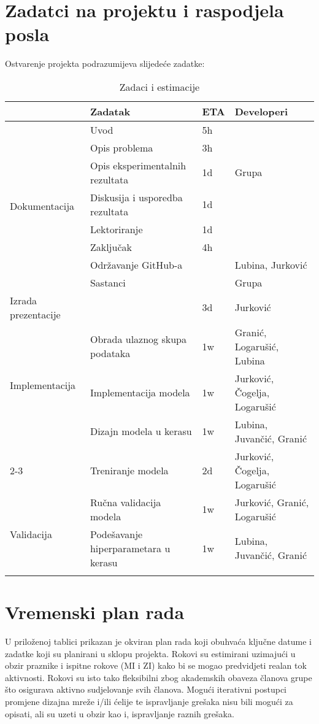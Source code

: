 \documentclass{report}
\begin{document}
\section{Zadatci na projektu i raspodjela posla}
Ostvarenje projekta podrazumijeva slijedeće zadatke:
\begin{longtable}{|p{100pt}| p{110pt} |p{20pt}| p{80pt}|}
\hline
 & \textbf{Zadatak} & \textbf{ETA} & \textbf{Developeri}\\
\hline
\multirow{8}{*}{Dokumentacija} & Uvod & 5h \\ \cline{3-3}
 & Opis problema & 3h \\ \cline{2-3}
 & Opis eksperimentalnih rezultata & 1d & Grupa \\ \cline{2-3}
 & Diskusija i usporedba rezultata & 1d \\ \cline{2-3}
 & Lektoriranje & 1d \\ \cline{2-3}
 & Zaključak & 4h \\ \hline
\multirow{2}{*}{Administrativni poslovi} & Održavanje GitHub-a & & Lubina, Jurković\\ \cline{2-3} & Sastanci & & Grupa \\ \hline
\multirow{1}{*}{Izrada prezentacije} &  & 3d & Jurković \\ \hline
\multirow{3}{*}{Implementacija} & Obrada ulaznog skupa podataka & 1w & Granić,  Logarušić, Lubina \\ \cline{2-3}
& Implementacija modela & 1w & Jurković, Čogelja, Logarušić \\ \hline
& Dizajn modela u kerasu & 1w & Lubina, Juvančić, Granić \\ \cline{2-3}
\multirow{2}{*}{Treniranje}
 & Treniranje modela & 2d & Jurković, Čogelja, Logarušić\\ \hline
\multirow{3}{*}{Validacija} & Ručna validacija modela & 1w & Jurković, Granić,  Logarušić\\ \cline{2-3} 
 & Podešavanje hiperparametara u kerasu & 1w & Lubina, Juvančić, Granić  \\ \hline 
 
\caption{Zadaci i estimacije}

\end{longtable}
\section{Vremenski plan rada}

U priloženoj tablici prikazan je okviran plan rada koji obuhvaća ključne datume i zadatke koji su planirani u sklopu projekta. Rokovi su estimirani uzimajući u obzir praznike i ispitne rokove (MI i ZI) kako bi se mogao predvidjeti realan tok aktivnosti. Rokovi su isto tako fleksibilni zbog akademskih obaveza članova grupe što osigurava aktivno sudjelovanje svih članova. Mogući iterativni postupci promjene dizajna mreže i/ili ćelije te ispravljanje grešaka nisu bili mogući za opisati, ali su uzeti u obzir kao i, ispravljanje raznih grešaka.
\end{document}
